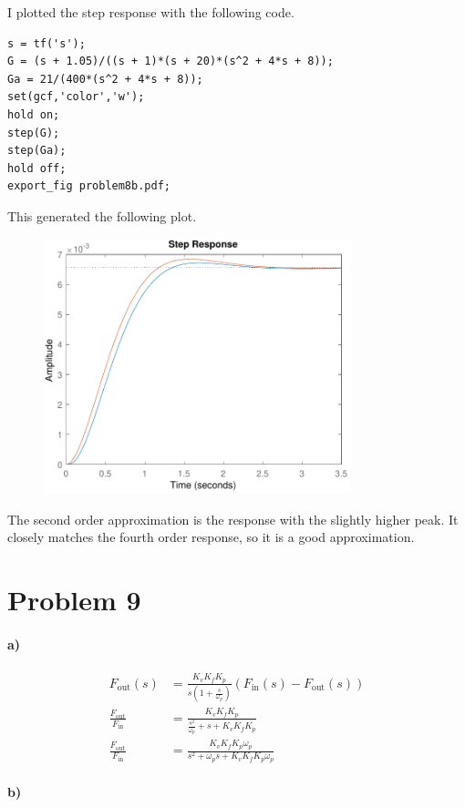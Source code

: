 \documentclass[12pt]{article}
\begin{document}
I plotted the step response with the following code.
\begin{verbatim}
s = tf('s');
G = (s + 1.05)/((s + 1)*(s + 20)*(s^2 + 4*s + 8));
Ga = 21/(400*(s^2 + 4*s + 8));
set(gcf,'color','w');
hold on;
step(G);
step(Ga);
hold off;
export_fig problem8b.pdf;
\end{verbatim}
This generated the following plot.
\begin{figure}[H]
    \begin{center}
        \includegraphics[width=3.5in]{problem8b.pdf}
    \end{center}
\end{figure}
The second order approximation is the response with the slightly higher peak. It closely matches the fourth order response, so
it is a good approximation.

\section*{Problem 9}

\paragraph{a)}

\begin{align*}
    F_\text{out}(s)&= \frac{K_vK_fK_p}{s\left(1+\frac{s}{\omega_p}\right)}(F_\text{in}(s)-F_\text{out}(s))\\
    \frac{F_\text{out}}{F_\text{in}}&=\frac{K_vK_fK_p}{\frac{s^2}{\omega_p}+s+K_vK_fK_p}\\
    \frac{F_\text{out}}{F_\text{in}}&=\frac{K_vK_fK_p\omega_p}{s^2+\omega_ps+K_vK_fK_p\omega_p}
\end{align*}

\paragraph{b)}
\end{document}
